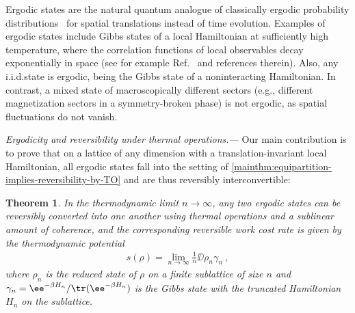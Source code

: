 \documentclass[prl,reprint,longbibliography,superscriptaddress]{revtex4-1}
\newcommand{\DKL}{\DD}
\newcounter{thm}
\newtheorem{maintheorem}[thm]{Theorem}
\renewcommand\paragraph[1]{%
  \par\emph{#1.---}\kern2pt\relax\ignorespaces}
\begin{document}
Ergodic states are the natural quantum analogue of classically ergodic
probability distributions~\cite{BookCoverThomas2006_InfTheory,%
  BookIsrael_ConvexityTheoryLatticeGases} for spatial translations instead of
time evolution.
%
Examples of ergodic states include Gibbs states of a local Hamiltonian at
sufficiently high temperature, where the correlation functions of local
observables decay exponentially in space (see for example Ref.~\cite{Tasaki2018}
and references therein).  Also, any i.i.d.\@ state is ergodic, being the Gibbs
state of a noninteracting Hamiltonian.  In contrast, a mixed state of
macroscopically different sectors (e.g., different magnetization sectors in a
symmetry-broken phase) is not ergodic, as spatial fluctuations do not vanish.

\paragraph{Ergodicity and reversibility under thermal operations}%
Our main contribution is to prove that on a lattice of any dimension with a
translation-invariant local Hamiltonian, all ergodic states fall into the
setting of \cref{mainthm:equipartition-implies-reversibility-by-TO} and are
thus reversibly interconvertible:

\begin{maintheorem}
  \label{mainthm:ergodic-state-has-thermo-potential}
  In the thermodynamic limit $n\to\infty$, any two ergodic states can be
  reversibly converted into one another using thermal operations and a sublinear
  amount of coherence, and the corresponding reversible work cost rate is given
  by the thermodynamic potential
  \begin{align}
    s(\rho) = \lim_{n\to\infty} \frac1n \DKL{\rho_n}{\gamma_n}\ ,
    \label{eq:mainthm-ergodic-state-thermo-potential-KL-divergence}
  \end{align}
  where $\rho_n$ is the reduced state of $\rho$ on a finite sublattice of size
  $n$ and $\gamma_n = \ee^{-\beta H_n} / \tr(\ee^{-\beta H_n})$ is the Gibbs
  state with the truncated Hamiltonian $H_n$ on the sublattice.
\end{maintheorem}
\end{document}
